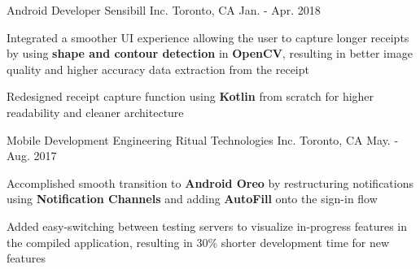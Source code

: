 \begin{cventries}

\cventry
{Android Developer} %
{Sensibill Inc.} %
{Toronto, CA} %
{Jan. - Apr. 2018} %
{ %
\begin{cvitems}
\item {
    Integrated a smoother UI experience allowing 
    the user to capture longer receipts by using 
    \textbf{shape and contour detection} in \textbf{OpenCV}, 
    resulting in better image quality 
    and higher accuracy data extraction from
    the receipt
}
\item {
    Redesigned receipt capture function 
    using \textbf{Kotlin} from scratch 
    for higher readability and cleaner architecture
}
\end{cvitems}
}


\cventry
{Mobile Development Engineering} %
{Ritual Technologies Inc.} %
{Toronto, CA} %
{May. - Aug. 2017} %
{ %
\begin{cvitems}
\item {
    Accomplished smooth transition to 
    \textbf{Android Oreo} 
    by restructuring notifications using 
    \textbf{Notification Channels}
    and adding 
    \textbf{AutoFill} onto the sign-in flow
}
\item {
    Added easy-switching between testing servers 
    to visualize in-progress features 
    in the compiled application, 
    resulting in 30\% shorter development time for new features
}
\end{cvitems} 
}




\end{cventries}